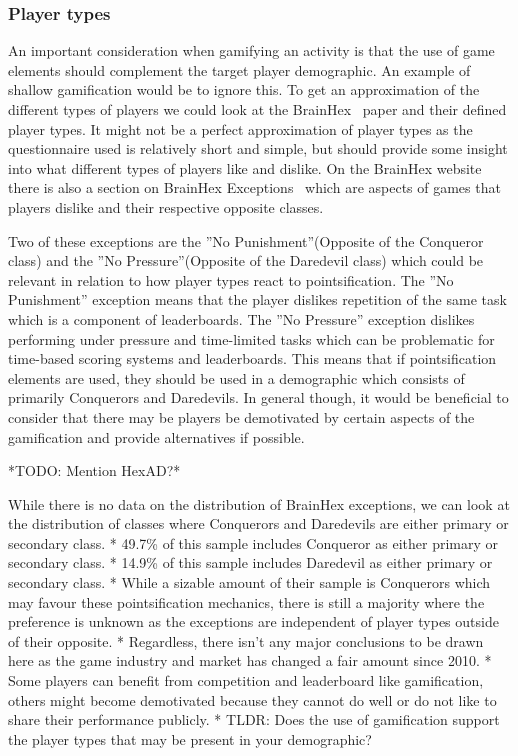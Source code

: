 \subsubsection{Player types}
An important consideration when gamifying an activity is that the use of game elements should complement the target player demographic. An example of shallow gamification would be to ignore this. To get an approximation of the different types of players we could look at the BrainHex~\cite{nacke2014brainhex} paper and their defined player types. It might not be a perfect approximation of player types as the questionnaire used is relatively short and simple, but should provide some insight into what different types of players like and dislike. On the BrainHex website there is also a section on BrainHex Exceptions~\cite{brainhexexceptions} which are aspects of games that players dislike and their respective opposite classes. 

Two of these exceptions are the ''No Punishment''(Opposite of the Conqueror class) and the ''No Pressure''(Opposite of the Daredevil class) which could be relevant in relation to how player types react to pointsification. The ''No Punishment'' exception means that the player dislikes repetition of the same task which is a component of leaderboards. The ''No Pressure'' exception dislikes performing under pressure and time-limited tasks which can be problematic for time-based scoring systems and leaderboards. This means that if pointsification elements are used, they should be used in a demographic which consists of primarily Conquerors and Daredevils. In general though, it would be beneficial to consider that there may be players be demotivated by certain aspects of the gamification and provide alternatives if possible. 

*TODO: Mention HexAD?*

While there is no data on the distribution of BrainHex exceptions, we can look at the distribution of classes where Conquerors and Daredevils are either primary or secondary class. 
            * 49.7\% of this sample includes Conqueror as either primary or secondary class.  
            * 14.9\% of this sample includes Daredevil as either primary or secondary class. 
            * While a sizable amount of their sample is Conquerors which may favour these pointsification mechanics, there is still a majority where the preference is unknown as the exceptions are independent of player types outside of their opposite. 
        * Regardless, there isn't any major conclusions to be drawn here as the game industry and market has changed a fair amount since 2010.
    * Some players can benefit from competition and leaderboard like gamification, others might become demotivated because they cannot do well or do not like to share their performance publicly. 
    * TLDR: Does the use of gamification support the player types that may be present in your demographic?
\fi

